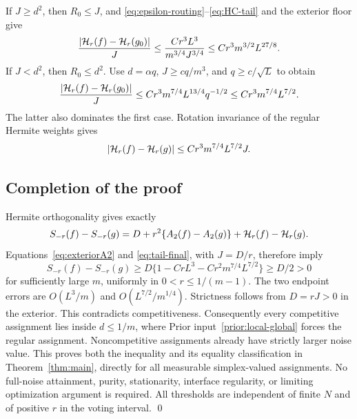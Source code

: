 If $J\ge d^2$, then $R_0\le J$, and
\eqref{eq:epsilon-routing}--\eqref{eq:HC-tail} and the exterior floor give
\[
 \frac{\lvert \mathcal H_r(f)-\mathcal H_r(g_0)\rvert}J
 \le\frac{Cr^3L^3}{m^{3/4}J^{3/4}}
 \le Cr^3m^{3/2}L^{27/8}.
\]
If $J<d^2$, then $R_0\le d^2$. Use $d=\alpha q$, $J\ge cq/m^3$,
and $q\ge c/\sqrt L$ to obtain
\[
 \frac{\lvert \mathcal H_r(f)-\mathcal H_r(g_0)\rvert}J
 \le Cr^3m^{7/4}L^{13/4}q^{-1/2}
 \le Cr^3m^{7/4}L^{7/2}.
\]
The latter also dominates the first case. Rotation invariance of the
regular Hermite weights gives
\begin{equation}\label{eq:tail-final}
 \lvert \mathcal H_r(f)-\mathcal H_r(g)\rvert
                       \le Cr^3m^{7/4}L^{7/2}J.
\end{equation}

\subsection{Completion of the proof}
Hermite orthogonality gives exactly
\[
 S_{-r}(f)-S_{-r}(g)
       =D+r^2\{A_2(f)-A_2(g)\}+\mathcal H_r(f)-\mathcal H_r(g).
\]
Equations~\eqref{eq:exteriorA2} and \eqref{eq:tail-final}, with $J=D/r$,
therefore imply
\begin{equation}\label{eq:strict-exterior}
 S_{-r}(f)-S_{-r}(g)
   \ge D\{1-CrL^3-Cr^2m^{7/4}L^{7/2}\}\ge D/2>0
\end{equation}
for sufficiently large $m$, uniformly in $0<r\le1/(m-1)$.
The two endpoint errors are $O(L^3/m)$ and
$O(L^{7/2}/m^{1/4})$. Strictness follows from $D=rJ>0$ in the exterior.
This contradicts competitiveness. Consequently every competitive assignment
lies inside $d\le1/m$, where Prior input~\ref{prior:local-global} forces
the regular assignment. Noncompetitive assignments already have strictly
larger noise value. This proves both the inequality and its equality
classification in Theorem~\ref{thm:main}, directly for all measurable
simplex-valued assignments. No full-noise attainment, purity, stationarity, interface
regularity, or limiting optimization argument is required. All thresholds
are independent of finite $N$ and of positive $r$ in the voting interval.
\qed

